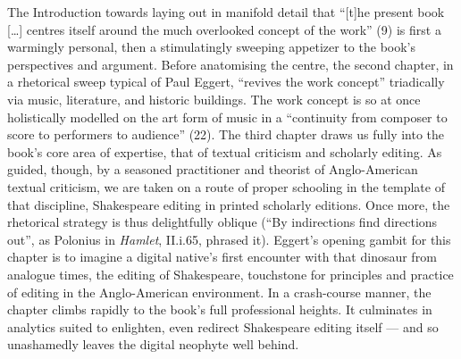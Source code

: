 \begin{review}
The Introduction towards laying out in manifold detail that ``{[}t{]}he
present book {[}\dots{}{]} centres itself around the much overlooked
concept of the work'' (9) is first a warmingly personal, then a
stimulatingly sweeping appetizer to the book's perspectives and
argument. Before anatomising the centre, the second chapter, in a
rhetorical sweep typical of Paul Eggert, ``revives the work concept''
triadically via music, literature, and historic buildings. The work
concept is so at once holistically modelled on the art form of music in
a ``continuity from composer to score to performers to audience'' (22).
The third chapter draws us fully into the book's core area of expertise,
that of textual criticism and scholarly editing. As guided, though, by a
seasoned practitioner and theorist of Anglo-American textual criticism,
we are taken on a route of proper schooling in the template of that
discipline, Shakespeare editing in printed scholarly editions. Once
more, the rhetorical strategy is thus delightfully oblique (``By
indirections find directions out'', as Polonius in \emph{Hamlet},
II.i.65, phrased it). Eggert's opening gambit for this chapter is to
imagine a digital native's first encounter with that dinosaur from
analogue times, the editing of Shakespeare, touchstone for principles
and practice of editing in the Anglo-American environment. In a
crash-course manner, the chapter climbs rapidly to the book's full
professional heights. It culminates in analytics suited to enlighten,
even redirect Shakespeare editing itself --- and so unashamedly leaves
the digital neophyte well behind.


\end{review}
